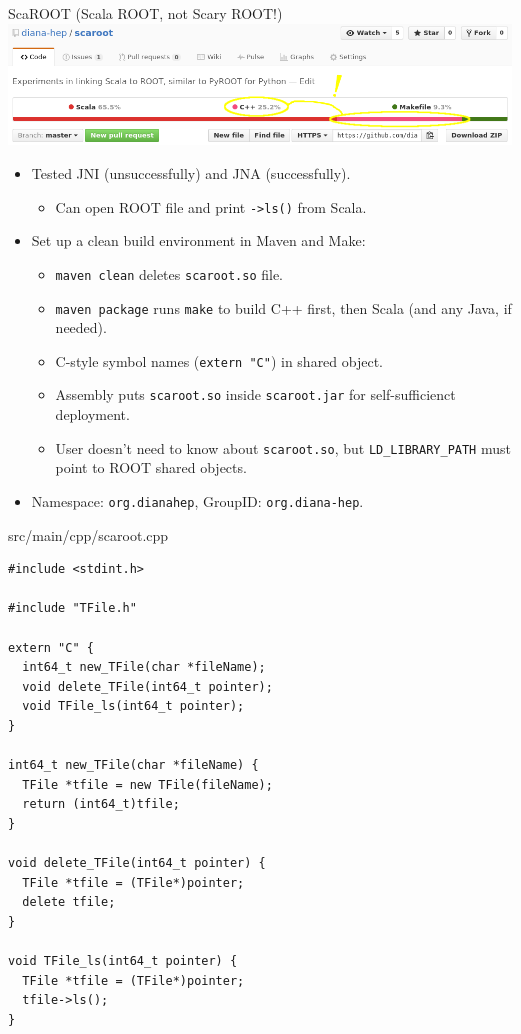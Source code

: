 \documentclass{beamer}
\begin{document}
\begin{frame}{ScaROOT {\small (Scala ROOT, not Scary ROOT!)}}
\includegraphics[width=\linewidth]{scaroot_languages.png}

\vspace{0.2 cm}
\begin{itemize}
\item Tested JNI (unsuccessfully) and JNA (successfully).
\begin{itemize}
\item Can open ROOT file and print {\tt ->ls()} from Scala.
\end{itemize}
\item Set up a clean build environment in Maven and Make:
\begin{itemize}
\item {\tt maven clean} deletes {\tt scaroot.so} file.
\item {\tt maven package} runs {\tt make} to build C++ first, then Scala (and any Java, if needed).
\item C-style symbol names ({\tt extern "C"}) in shared object.
\item Assembly puts {\tt scaroot.so} inside {\tt scaroot.jar} for self-sufficienct deployment.
\item User doesn't need to know about {\tt scaroot.so}, but {\tt LD\_LIBRARY\_PATH} must point to ROOT shared objects.
\end{itemize}
\item Namespace: {\tt org.dianahep}, GroupID: {\tt org.diana-hep}.
\end{itemize}
\end{frame}

\begin{frame}[fragile]{src/main/cpp/scaroot.cpp}
\begin{verbatim}
#include <stdint.h>

#include "TFile.h"

extern "C" {
  int64_t new_TFile(char *fileName);
  void delete_TFile(int64_t pointer);
  void TFile_ls(int64_t pointer);
}

int64_t new_TFile(char *fileName) {
  TFile *tfile = new TFile(fileName);
  return (int64_t)tfile;
}

void delete_TFile(int64_t pointer) {
  TFile *tfile = (TFile*)pointer;
  delete tfile;
}

void TFile_ls(int64_t pointer) {
  TFile *tfile = (TFile*)pointer;
  tfile->ls();
}
\end{verbatim}
\end{frame}
\end{document}
